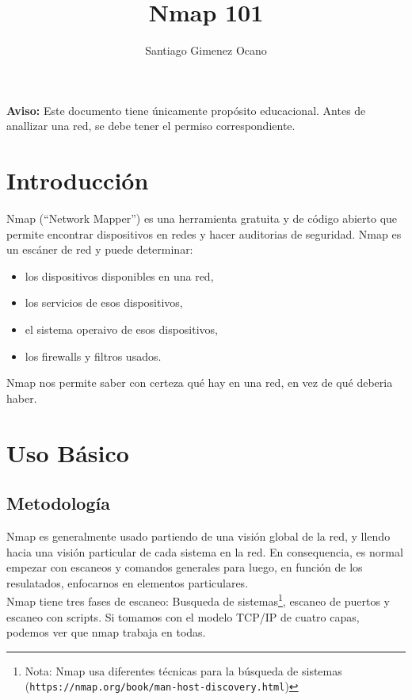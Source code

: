 \documentclass{article}
\title{Nmap 101}
\author{Santiago Gimenez Ocano}
\date{}
\begin{document}
\maketitle

\textbf{Aviso:} Este documento tiene \'unicamente prop\'osito educacional. Antes de anallizar una red, se debe tener el permiso correspondiente.

\section{Introducci\'on}
Nmap (``Network Mapper'') es una herramienta gratuita y de c\'odigo abierto que permite encontrar dispositivos en redes y hacer auditorias de seguridad. Nmap es un esc\'aner de red y puede determinar:

\begin{itemize}
    \item los dispositivos disponibles en una red,
    \item los servicios de esos dispositivos,
    \item el sistema operaivo de esos dispositivos,
    \item los firewalls y filtros usados.
\end{itemize}

Nmap nos permite saber con certeza qu\'e hay en una red, en vez de qu\'e deberia haber.

\section{Uso B\'asico}

\subsection{Metodolog\'ia}

Nmap es generalmente usado partiendo de una visi\'on global de la red, y llendo hacia una visi\'on particular de cada sistema en la red. En consequencia, es normal empezar con escaneos y comandos generales para luego, en funci\'on de los resulatados, enfocarnos en elementos particulares. \\

Nmap tiene tres fases de escaneo: Busqueda de sistemas\footnote{Nota: Nmap usa diferentes t\'ecnicas para la b\'usqueda de sistemas (\texttt{https://nmap.org/book/man-host-discovery.html})}, escaneo de puertos y escaneo con scripts. Si tomamos con el modelo TCP/IP de cuatro capas, podemos ver que nmap trabaja en todas. \\
\end{document}
